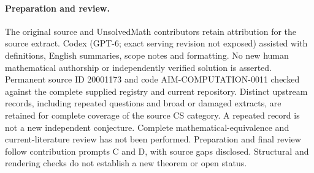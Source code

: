 \documentclass[11pt]{article}
\begin{document}
\paragraph{Preparation and review.}
The original source and UnsolvedMath contributors retain attribution for the source extract. Codex (GPT-6; exact serving revision not exposed) assisted with definitions, English summaries, scope notes and formatting. No new human mathematical authorship or independently verified solution is asserted. Permanent source ID 20001173 and code AIM-COMPUTATION-0011 checked against the complete supplied registry and current repository. Distinct upstream records, including repeated questions and broad or damaged extracts, are retained for complete coverage of the source CS category. A repeated record is not a new independent conjecture. Complete mathematical-equivalence and current-literature review has not been performed. Preparation and final review follow contribution prompts C and D, with source gaps disclosed. Structural and rendering checks do not establish a new theorem or open status.
\label{end:20001173}
\end{document}
